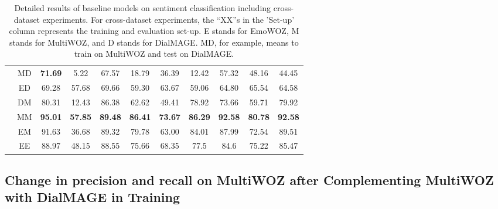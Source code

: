 \documentclass[10pt, a4paper]{article}
\begin{document}
\begin{table}[H]
\begin{tabular}{l|c|ccc|ccc|ccc}
 & MD & \textbf{71.69} & 5.22 & 67.57 & 18.79 & 36.39 & 12.42 & 57.32 & 48.16 & 44.45 \\
 & ED & 69.28 & 57.68 & 69.66 & 59.30 & 63.67 & 59.06 & 64.80 & 65.54 & 64.58 \\\cline{2-11}
 & DM & 80.31 & 12.43 & 86.38 & 62.62 & 49.41 & 78.92 & 73.66 & 59.71 & 79.92 \\
 & MM & \textbf{95.01} & \textbf{57.85} & \textbf{89.48} & \textbf{86.41} & \textbf{73.67} & \textbf{86.29} & \textbf{92.58} & \textbf{80.78} & \textbf{92.58} \\
 & EM & 91.63 & 36.68 & 89.32 & 79.78 & 63.00 & 84.01 & 87.99 & 72.54 & 89.51 \\ \cline{2-11}
 & EE & 88.97 & 48.15 & 88.55 & 75.66 & 68.35 & 77.5 & 84.6 & 75.22 & 85.47 \\
\bottomrule[1pt]
\end{tabular}
\caption{Detailed results of baseline models on sentiment classification including cross-dataset experiments. For cross-dataset experiments, the ``XX''s in the 'Set-up' column represents the training and evaluation set-up. E stands for EmoWOZ, M stands for MultiWOZ, and D stands for DialMAGE. MD, for example, means to train on MultiWOZ and test on DialMAGE.}
    \label{tab:f1-cross-sentiment}

\end{table}


\newpage
\subsection{Change in precision and recall on MultiWOZ after Complementing MultiWOZ with DialMAGE in Training}
\label{sec:precision-recall}
\end{document}
